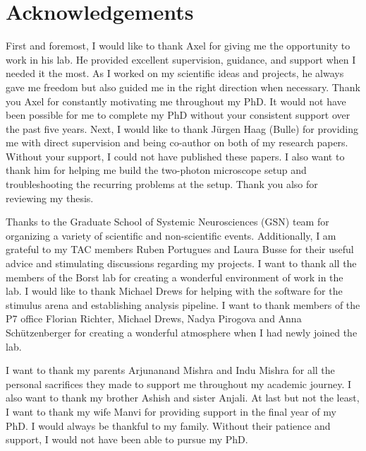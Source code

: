 
\begingroup
\let\clearpage\relax
\let\cleardoublepage\relax
\let\cleardoublepage\relax

\chapter*{Acknowledgements}

First and foremost, I would like to thank Axel for giving me the opportunity to work in his lab. He provided excellent supervision, guidance, and support when I needed it the most. As I worked on my scientific ideas and projects, he always gave me freedom but also guided me in the right direction when necessary. Thank you Axel for constantly motivating me throughout my PhD. It would not have been possible for me to complete my PhD without your consistent support over the past five years. Next, I would like to thank Jürgen Haag (Bulle) for providing me with direct supervision and being co-author on both of my research papers. Without your support, I could not have published these papers. I also want to thank him for helping me build the two-photon microscope setup and troubleshooting the recurring problems at the setup. Thank you also for reviewing my thesis. 

Thanks to the Graduate School of Systemic Neurosciences (GSN) team for organizing a variety of scientific and non-scientific events. Additionally, I am grateful to my TAC members Ruben Portugues and Laura Busse for their useful advice and stimulating discussions regarding my projects. I want to thank all the members of the Borst lab for creating a wonderful environment of work in the lab. I would like to thank Michael Drews for helping with the software for the stimulus arena and establishing analysis pipeline. I want to thank members of the P7 office Florian Richter, Michael Drews, Nadya Pirogova and Anna Schützenberger for creating a wonderful atmosphere when I had newly joined the lab. 

I want to thank my parents Arjunanand Mishra and Indu Mishra for all the personal sacrifices they made to support me throughout my academic journey. I also want to thank my brother Ashish and sister Anjali. At last but not the least, I want to thank my wife Manvi for providing support in the final year of my PhD. I would always be thankful to my family. Without their patience and support, I would not have been able to pursue my PhD.


